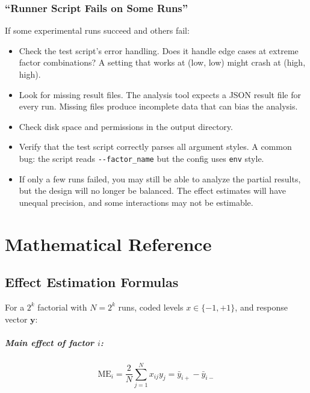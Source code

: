 \documentclass[11pt]{book}
\begin{document}
\subsection{``Runner Script Fails on Some Runs''}

If some experimental runs succeed and others fail:
\begin{itemize}[nosep]
\item Check the test script's error handling. Does it handle edge cases at
      extreme factor combinations? A setting that works at (low, low) might
      crash at (high, high).
\item Look for missing result files. The analysis tool expects a JSON result
      file for every run. Missing files produce incomplete data that can bias
      the analysis.
\item Check disk space and permissions in the output directory.
\item Verify that the test script correctly parses all argument styles. A
      common bug: the script reads \texttt{-{}-factor\_name} but the config
      uses \texttt{env} style.
\item If only a few runs failed, you may still be able to analyze the partial
      results, but the design will no longer be balanced. The effect estimates
      will have unequal precision, and some interactions may not be estimable.
\end{itemize}


\appendix

\chapter{Mathematical Reference}

\section{Effect Estimation Formulas}

For a $2^k$ factorial with $N = 2^k$ runs, coded levels $x \in \{-1, +1\}$, and
response vector $\mathbf{y}$:

\paragraph{Main effect of factor $i$:}
\[
\text{ME}_i = \frac{2}{N} \sum_{j=1}^{N} x_{ij} y_j
= \bar{y}_{i+} - \bar{y}_{i-}
\]
\end{document}
